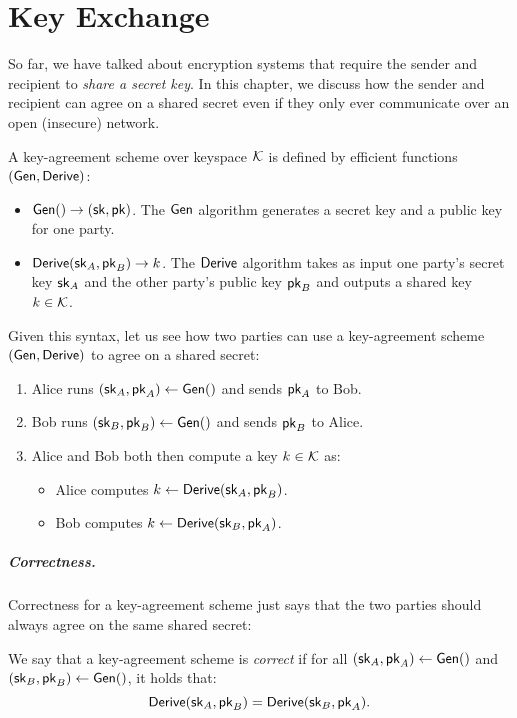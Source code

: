 \chapter{Key Exchange}

So far, we have talked about encryption systems that require
the sender and recipient to \emph{share a secret key}.
In this chapter, we discuss how the sender and recipient
can agree on a shared secret even if they only ever communicate
over an open (insecure) network.

A key-agreement scheme over keyspace $\mathcal{K}$ is defined by efficient functions $(\mathsf{Gen}, \mathsf{Derive})$:
\begin{itemize}[noitemsep]
  \item $\mathsf{Gen}() \to ({\mathsf{sk}}, \mathsf{pk})$. The $\mathsf{Gen}$ algorithm 
    generates a secret key and a public key for one party.
  \item $\mathsf{Derive}({\mathsf{sk}}_A, \mathsf{pk}_B) \to k$. The $\mathsf{Derive}$ algorithm
    takes as input one party's secret key ${\mathsf{sk}}_A$ and the
    other party's public key $\mathsf{pk}_B$ and outputs a shared
    key $k \in \mathcal{K}$.
\end{itemize}

Given this syntax, let us see how two parties can use a key-agreement 
scheme $(\mathsf{Gen}, \mathsf{Derive})$ to agree on a shared secret:
\begin{enumerate}[noitemsep]
  \item Alice runs $({\mathsf{sk}}_A, \mathsf{pk}_A) \gets \mathsf{Gen}()$ and sends $\mathsf{pk}_A$ to Bob.
  \item Bob runs $({\mathsf{sk}}_B, \mathsf{pk}_B) \gets \mathsf{Gen}()$ and sends $\mathsf{pk}_B$ to Alice.
	\item Alice and Bob both then compute a key $k \in \mathcal{K}$ as:
		\begin{itemize}
      \item Alice computes $k \gets \mathsf{Derive}({\mathsf{sk}}_A, \mathsf{pk}_B)$.
      \item Bob computes $k \gets \mathsf{Derive}({\mathsf{sk}}_B, \mathsf{pk}_A)$.
		\end{itemize}
\end{enumerate}


\paragraph{Correctness.} 
Correctness for a key-agreement scheme just says that the two parties
should always agree on the same shared secret:

\begin{definition}
We say that a key-agreement scheme is \emph{correct} if
for all 
$({\mathsf{sk}}_A, \mathsf{pk}_A) \gets \mathsf{Gen}()$ and
$({\mathsf{sk}}_B, \mathsf{pk}_B) \gets \mathsf{Gen}()$, it holds that: 
\[ \mathsf{Derive}({\mathsf{sk}}_A, \mathsf{pk}_B) = \mathsf{Derive}({\mathsf{sk}}_B, \mathsf{pk}_A). \]
\end{definition}


